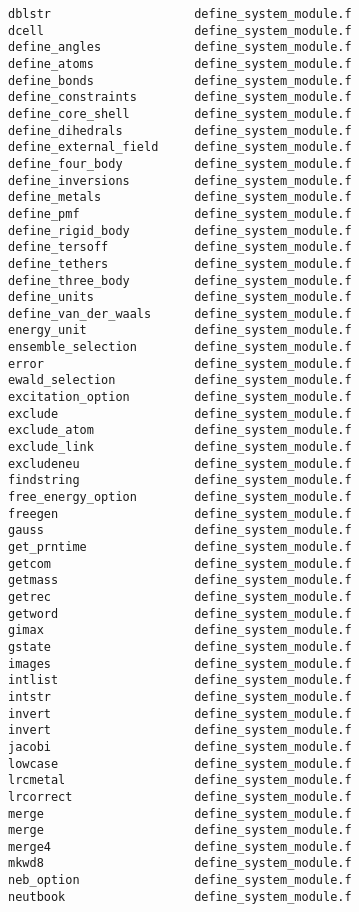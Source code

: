 \begin{verbatim}
dblstr                    define_system_module.f
dcell                     define_system_module.f
define_angles             define_system_module.f
define_atoms              define_system_module.f
define_bonds              define_system_module.f
define_constraints        define_system_module.f
define_core_shell         define_system_module.f
define_dihedrals          define_system_module.f
define_external_field     define_system_module.f
define_four_body          define_system_module.f
define_inversions         define_system_module.f
define_metals             define_system_module.f
define_pmf                define_system_module.f
define_rigid_body         define_system_module.f
define_tersoff            define_system_module.f
define_tethers            define_system_module.f
define_three_body         define_system_module.f
define_units              define_system_module.f
define_van_der_waals      define_system_module.f
energy_unit               define_system_module.f
ensemble_selection        define_system_module.f
error                     define_system_module.f
ewald_selection           define_system_module.f
excitation_option         define_system_module.f
exclude                   define_system_module.f
exclude_atom              define_system_module.f
exclude_link              define_system_module.f
excludeneu                define_system_module.f
findstring                define_system_module.f
free_energy_option        define_system_module.f
freegen                   define_system_module.f
gauss                     define_system_module.f
get_prntime               define_system_module.f
getcom                    define_system_module.f
getmass                   define_system_module.f
getrec                    define_system_module.f
getword                   define_system_module.f
gimax                     define_system_module.f
gstate                    define_system_module.f
images                    define_system_module.f
intlist                   define_system_module.f
intstr                    define_system_module.f
invert                    define_system_module.f
invert                    define_system_module.f
jacobi                    define_system_module.f
lowcase                   define_system_module.f
lrcmetal                  define_system_module.f
lrcorrect                 define_system_module.f
merge                     define_system_module.f
merge                     define_system_module.f
merge4                    define_system_module.f
mkwd8                     define_system_module.f
neb_option                define_system_module.f
neutbook                  define_system_module.f

\end{verbatim}
